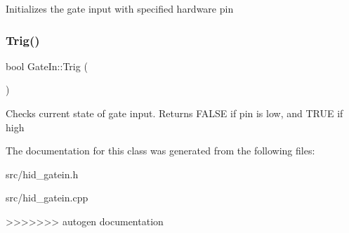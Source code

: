 Initializes the gate input with specified hardware pin \mbox{\label{classdaisy_1_1_gate_in_a1be8327985451bd0695db1dd7e207315}} 
\subsubsection{\texorpdfstring{Trig()}{Trig()}}
{\footnotesize\ttfamily bool Gate\+In\+::\+Trig (\begin{DoxyParamCaption}{ }\end{DoxyParamCaption})}

Checks current state of gate input. Returns F\+A\+L\+SE if pin is low, and T\+R\+UE if high 

The documentation for this class was generated from the following files\+:\begin{DoxyCompactItemize}
\item 
src/hid\+\_\+gatein.\+h\item 
src/hid\+\_\+gatein.\+cpp\end{DoxyCompactItemize}
>>>>>>> autogen documentation
